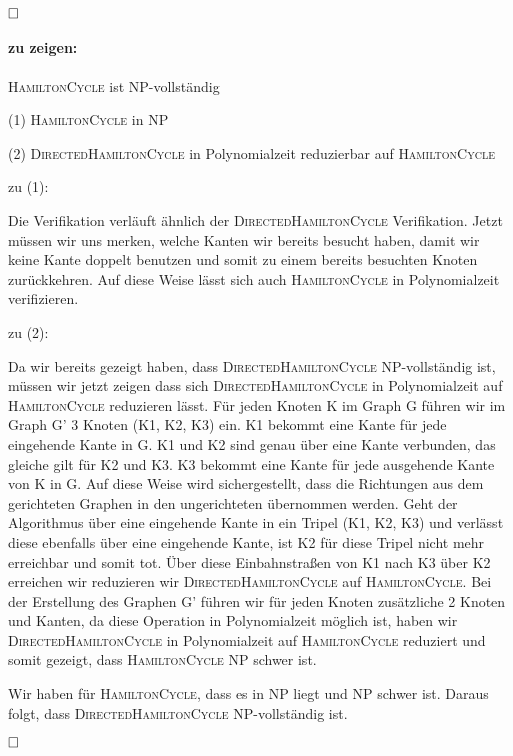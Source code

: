 \documentclass[12pt]{scrartcl}%
\theoremstyle{nonumberplain}
\begin{document}
$\hfill \square$ 

\paragraph{zu zeigen:} {\scshape HamiltonCycle} ist NP-vollständig

\vspace{0.2cm}
(1) {\scshape HamiltonCycle} in NP
\vspace{0.2cm}

(2) {\scshape DirectedHamiltonCycle} in Polynomialzeit reduzierbar auf {\scshape HamiltonCycle}
\vspace{0.4cm}

zu (1): 

Die Verifikation verläuft ähnlich der {\scshape DirectedHamiltonCycle} Verifikation. Jetzt müssen wir uns merken, welche Kanten wir bereits besucht haben, damit wir keine Kante doppelt benutzen und somit zu einem bereits besuchten Knoten zurückkehren. Auf diese Weise lässt sich auch {\scshape HamiltonCycle} in Polynomialzeit verifizieren.
\vspace{0.2cm}

zu (2): 

Da wir bereits gezeigt haben, dass {\scshape DirectedHamiltonCycle} NP-vollständig ist, müssen wir jetzt zeigen dass sich {\scshape DirectedHamiltonCycle} in Polynomialzeit auf {\scshape HamiltonCycle} reduzieren lässt. Für jeden Knoten K im Graph G führen wir im Graph G' 3 Knoten (K1, K2, K3) ein. K1 bekommt eine Kante für jede eingehende Kante in G. K1 und K2 sind genau über eine Kante verbunden, das gleiche gilt für K2 und K3. K3 bekommt eine Kante für jede ausgehende Kante von K in G. Auf diese Weise wird sichergestellt, dass die Richtungen aus dem gerichteten Graphen in den ungerichteten übernommen werden. Geht der Algorithmus über eine eingehende Kante in ein Tripel (K1, K2, K3) und verlässt diese ebenfalls über eine eingehende Kante, ist K2 für diese Tripel nicht mehr erreichbar und somit tot. Über diese Einbahnstraßen von K1 nach K3 über K2 erreichen wir reduzieren wir {\scshape DirectedHamiltonCycle} auf {\scshape HamiltonCycle}. Bei der Erstellung des Graphen G' führen wir für jeden Knoten zusätzliche 2 Knoten und Kanten, da diese Operation in Polynomialzeit möglich ist, haben wir {\scshape DirectedHamiltonCycle} in Polynomialzeit auf {\scshape HamiltonCycle} reduziert und somit gezeigt, dass {\scshape HamiltonCycle} NP schwer ist.

\vspace{0.2cm}

Wir haben für {\scshape HamiltonCycle}, dass es in NP liegt und NP schwer ist. Daraus folgt, dass {\scshape DirectedHamiltonCycle} NP-vollständig ist.

$\hfill \square$ 
\end{document}
